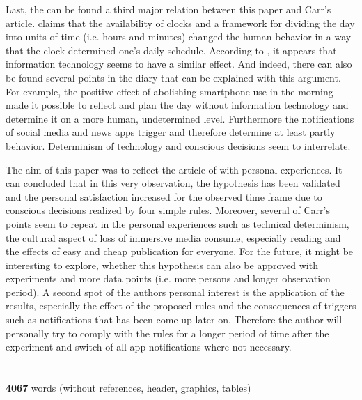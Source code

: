 Last, the can be found a third major relation between this paper and Carr's article. \cite{Carr.2008} claims that the availability of clocks and a framework for dividing the day into units of time (i.e. hours and minutes) changed the human behavior in a way that the clock determined one's daily schedule. According to \cite{Carr.2008}, it appears that information technology seems to have a similar effect. And indeed, there can also be found several points in the diary that can be explained with this argument. For example, the positive effect of abolishing smartphone use in the morning made it possible to reflect and plan the day without information technology and determine it on a more human, undetermined level. Furthermore the notifications of social media and news apps trigger and therefore determine at least partly behavior. Determinism of technology and conscious decisions seem to interrelate.

The aim of this paper was to reflect the article of \citep{Carr.2008} with personal experiences. It can concluded that in this very observation, the hypothesis has been validated and the personal satisfaction increased for the observed time frame due to conscious decisions realized by four simple rules. Moreover, several of Carr's points seem to repeat in the personal experiences such as technical determinism, the cultural aspect of loss of immersive media consume, especially reading and the effects of easy and cheap publication for everyone. For the future, it might be interesting to explore, whether this hypothesis can also be approved with experiments and more data points (i.e. more persons and longer observation period). A second spot of the authors personal interest is the application of the results, especially the effect of the proposed rules and the consequences of triggers such as notifications that has been come up later on. Therefore the author will personally try to comply with the rules for a longer period of time after the experiment and switch of all app notifications where not necessary.\\

\ \\
\ \\
\textbf{4067} words (without references, header, graphics, tables)